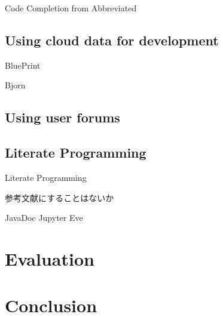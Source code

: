 \documentclass{sigchi}
\begin{document}
Code Completion from Abbreviated\cite{Han:2009:CCA:1747491.1747530}

\subsection{Using cloud data for development}

BluePrint \cite{Brandt:2010:EPI:1753326.1753402}

Bjorn\cite{Hartmann:2010:OPS:1753326.1753478}

\subsection{Using user forums}


\subsection{Literate Programming}

Literate Programming\cite{Knuth}

参考文献にすることはないか

JavaDoc
Jupyter
Eve

\section{Evaluation}

\section{Conclusion}




\end{document}
